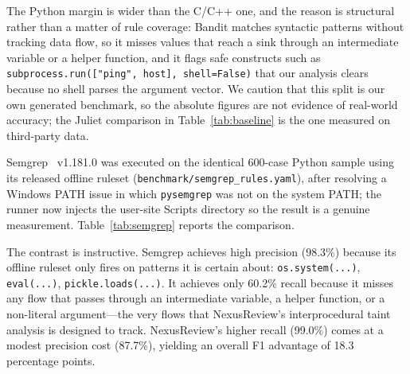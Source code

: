 \documentclass[10pt,conference]{IEEEtran}
\begin{document}
The Python margin is wider than the C/C++ one, and the reason is structural
rather than a matter of rule coverage: Bandit matches syntactic patterns
without tracking data flow, so it misses values that reach a sink through an
intermediate variable or a helper function, and it flags safe constructs such
as \texttt{subprocess.run(["ping", host], shell=False)} that our analysis
clears because no shell parses the argument vector. We caution that this
split is our own generated benchmark, so the absolute figures are not
evidence of real-world accuracy; the Juliet comparison in
Table~\ref{tab:baseline} is the one measured on third-party data.

Semgrep~\cite{semgrep} v1.181.0 was executed on the identical 600-case
Python sample using its released offline ruleset
(\texttt{benchmark/semgrep_rules.yaml}), after resolving a Windows PATH
issue in which \texttt{pysemgrep} was not on the system PATH; the runner
now injects the user-site Scripts directory so the result is a genuine
measurement. Table~\ref{tab:semgrep} reports the comparison.

\begin{table}[t]
\centering
\caption{RQ4: comparison with Semgrep on an identical 600-case Python
sample (289 vulnerable, 311 benign), case level. Semgrep uses its released
offline Python ruleset; NexusReview uses its default symbolic pipeline.
Baselines scored with line-only matching.}
\label{tab:semgrep}
\end{table}

The contrast is instructive. Semgrep achieves high precision (98.3\%) because
its offline ruleset only fires on patterns it is certain about: \texttt{os.system(...)},
\texttt{eval(...)}, \texttt{pickle.loads(...)}. It achieves only 60.2\% recall
because it misses any flow that passes through an intermediate variable,
a helper function, or a non-literal argument---the very flows that
NexusReview's interprocedural taint analysis is designed to track.
NexusReview's higher recall (99.0\%) comes at a modest precision cost
(87.7\%), yielding an overall F1 advantage of 18.3 percentage points.
\end{document}
